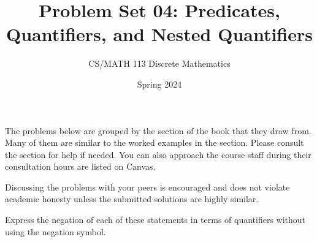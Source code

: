\documentclass[a4paper]{exam}
\title{Problem Set 04: Predicates, Quantifiers, and Nested Quantifiers}
\author{CS/MATH 113 Discrete Mathematics}
\date{Spring 2024}
\begin{document}
\maketitle

The problems below are grouped by the section of the book that they draw from. Many of them are similar to the worked examples in the section. Please consult the section for help if needed. You can also approach the course staff during their consultation hours are listed on Canvas.

Discussing the problems with your peers is encouraged and does not violate academic honesty unless the submitted solutions are highly similar.

\begin{questions}

  \question Express the negation of each of these statements in terms of quantifiers without using the negation symbol.
\end{questions}
\end{document}
